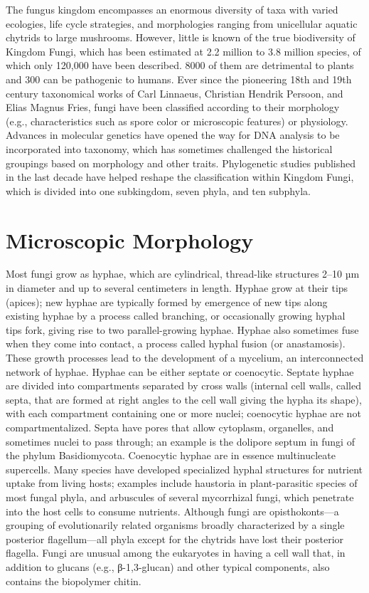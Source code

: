 \documentclass[]{book}
\theoremstyle{definition}
\theoremstyle{definition}
\theoremstyle{definition}
\theoremstyle{remark}
\begin{document}
The fungus kingdom encompasses an enormous diversity of taxa with varied
ecologies, life cycle strategies, and morphologies ranging from
unicellular aquatic chytrids to large mushrooms. However, little is
known of the true biodiversity of Kingdom Fungi, which has been
estimated at 2.2 million to 3.8 million species, of which only 120,000
have been described. 8000 of them are detrimental to plants and 300 can
be pathogenic to humans. Ever since the pioneering 18th and 19th century
taxonomical works of Carl Linnaeus, Christian Hendrik Persoon, and Elias
Magnus Fries, fungi have been classified according to their morphology
(e.g., characteristics such as spore color or microscopic features) or
physiology. Advances in molecular genetics have opened the way for DNA
analysis to be incorporated into taxonomy, which has sometimes
challenged the historical groupings based on morphology and other
traits. Phylogenetic studies published in the last decade have helped
reshape the classification within Kingdom Fungi, which is divided into
one subkingdom, seven phyla, and ten subphyla.

\section{Microscopic Morphology}\label{microscopic-morphology}

Most fungi grow as hyphae, which are cylindrical, thread-like structures
2--10 µm in diameter and up to several centimeters in length. Hyphae
grow at their tips (apices); new hyphae are typically formed by
emergence of new tips along existing hyphae by a process called
branching, or occasionally growing hyphal tips fork, giving rise to two
parallel-growing hyphae. Hyphae also sometimes fuse when they come into
contact, a process called hyphal fusion (or anastamosis). These growth
processes lead to the development of a mycelium, an interconnected
network of hyphae. Hyphae can be either septate or coenocytic. Septate
hyphae are divided into compartments separated by cross walls (internal
cell walls, called septa, that are formed at right angles to the cell
wall giving the hypha its shape), with each compartment containing one
or more nuclei; coenocytic hyphae are not compartmentalized. Septa have
pores that allow cytoplasm, organelles, and sometimes nuclei to pass
through; an example is the dolipore septum in fungi of the phylum
Basidiomycota. Coenocytic hyphae are in essence multinucleate
supercells. Many species have developed specialized hyphal structures
for nutrient uptake from living hosts; examples include haustoria in
plant-parasitic species of most fungal phyla, and arbuscules of several
mycorrhizal fungi, which penetrate into the host cells to consume
nutrients. Although fungi are opisthokonts---a grouping of
evolutionarily related organisms broadly characterized by a single
posterior flagellum---all phyla except for the chytrids have lost their
posterior flagella. Fungi are unusual among the eukaryotes in having a
cell wall that, in addition to glucans (e.g., β-1,3-glucan) and other
typical components, also contains the biopolymer chitin.
\end{document}
